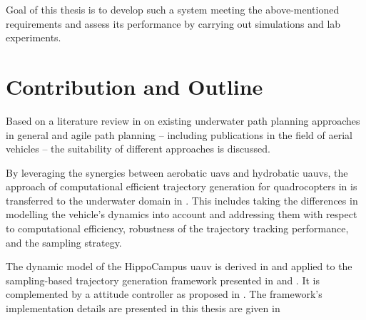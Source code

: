 Goal of this thesis is to develop such a system meeting the above-mentioned requirements and assess its performance by carrying out simulations and lab experiments.

\section{Contribution and Outline}

Based on a literature review in  on existing underwater path planning approaches in general and agile path planning -- including publications in the field of aerial vehicles -- the suitability of different approaches is discussed. 

By leveraging the synergies between aerobatic \acp{uav} and hydrobatic \acp{uauv}, the approach of computational efficient trajectory generation for quadrocopters in \cite{MuellerHehn15} is transferred to the underwater domain in .
This includes taking the differences in modelling the vehicle's dynamics into account and addressing them with respect to computational efficiency, robustness of the trajectory tracking performance, and the sampling strategy.

The dynamic model of the HippoCampus \ac{uauv} is derived in  and applied to the sampling-based trajectory generation framework presented in  and .
It is complemented by a attitude controller as proposed in .
The framework's implementation details are presented in this thesis are given in 

